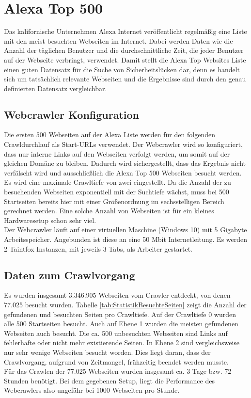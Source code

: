 \section{Alexa Top 500}
\label{sec:Alexa500}
Das kalifornische Unternehmen Alexa Internet veröffentlicht regelmäßig eine Liste mit den meist besuchten Webseiten im Internet. Dabei werden Daten wie die Anzahl der täglichen Benutzer und die durchschnittliche Zeit, die jeder Benutzer auf der Webseite verbringt, verwendet. Damit stellt die Alexa Top Websites Liste einen guten Datensatz für die Suche von Sicherheitslücken dar, denn es handelt sich um tatsächlich relevante Webseiten und die Ergebnisse sind durch den genau definierten Datensatz vergleichbar.\\
\subsection{Webcrawler Konfiguration}
Die ersten 500 Webseiten auf der Alexa Liste werden für den folgenden Crawldurchlauf als Start-URLs verwendet. Der Webcrawler wird so konfiguriert, dass nur interne Links auf den Webseiten verfolgt werden, um somit auf der gleichen Domäne zu bleiben. Dadurch wird sichergestellt, dass das Ergebnis nicht verfälscht wird und ausschließlich die Alexa Top 500 Webseiten besucht werden. \\
Es wird eine maximale Crawltiefe von zwei eingestellt. Da die Anzahl der zu besuchenden Webseiten exponentiell mit der Suchtiefe wächst, muss bei 500 Startseiten bereits hier mit einer Größenordnung im sechsstelligen Bereich gerechnet werden. Eine solche Anzahl von Webseiten ist für ein kleines Hardwaresetup schon sehr viel.\\
Der Webcrawler läuft auf einer virtuellen Maschine (Windows 10) mit 5 Gigabyte Arbeitsspeicher. Angebunden ist diese an eine 50 Mbit Internetleitung. Es werden 2 Taintfox Instanzen, mit jeweils 3 Tabs, als Arbeiter gestartet.
\subsection{Daten zum Crawlvorgang}
Es wurden insgesamt 3.346.905 Webseiten vom Crawler entdeckt, von denen 77.025 besucht wurden. Tabelle \ref{tab:StatistikBesuchteSeiten} zeigt die Anzahl der gefundenen und besuchten Seiten pro Crawltiefe. Auf der Crawltiefe 0 wurden alle 500 Startseiten besucht. Auch auf Ebene 1 wurden die meisten gefundenen Webseiten auch besucht. Die ca. 500 unbesuchten Webseiten sind Links auf fehlerhafte oder nicht mehr existierende Seiten. In Ebene 2 sind vergleichsweise nur sehr wenige Webseiten besucht worden. Dies liegt daran, dass der Crawlvorgang, aufgrund von Zeitmangel, frühzeitig beendet werden musste. \\
Für das Crawlen der 77.025 Webseiten wurden insgesamt ca. 3 Tage bzw. 72 Stunden benötigt. Bei dem gegebenen Setup, liegt die Performance des Webcrawlers also ungefähr bei 1000 Webseiten pro Stunde.

